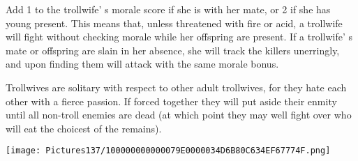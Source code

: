 \documentclass[a4paper,twoside,openany,10pt]{book}
\begin{document}
\begin{multicols}{2}
Add 1 to the trollwife' s morale score if she is with her mate, or 2 if she has young present. This means that, unless threatened with fire or acid, a trollwife will fight without checking morale while her offspring are present. If a trollwife' s mate or offspring are slain in her absence, she will track the killers unerringly, and upon finding them will attack with the same morale bonus.

Trollwives are solitary with respect to other adult trollwives, for they hate each other with a fierce passion. If forced together they will put aside their enmity until all non-troll enemies are dead (at which point they may well fight over who will eat the choicest of the remains). 

\end{multicols}

\begin{center} \texttt{[image: Pictures137/100000000000079E0000034D6B80C634EF67774F.png]} \end{center}
\end{document}
